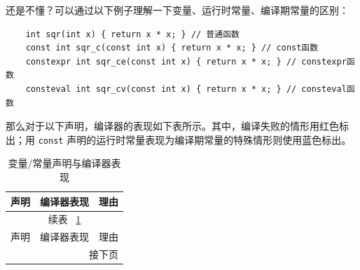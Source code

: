 \begin{tip}
  还是不懂？可以通过以下例子理解一下变量、运行时常量、编译期常量的区别：
\begin{verbatim}
    int sqr(int x) { return x * x; } // 普通函数
    const int sqr_c(const int x) { return x * x; } // const函数
    constexpr int sqr_ce(const int x) { return x * x; } // constexpr函数
    consteval int sqr_cv(const int x) { return x * x; } // consteval函数
\end{verbatim}

  那么对于以下声明，编译器的表现如下表所示。其中，编译失败的情形用红色标出；用 \texttt{const} 声明的运行时常量表现为编译期常量的特殊情形则使用蓝色标出。
  \begin{small}            %
    \begin{longtable}[c]{lll}
      \caption{变量/常量声明与编译器表现}
      \label{tab:long}\\
      \toprule
      声明 & 编译器表现 & 理由 \\
      \midrule
      \endfirsthead          %

      \multicolumn{3}{c}{\footnotesize 续表~ \ref{tab:long} }\\[.5ex]
      \toprule
      声明 & 编译器表现 & 理由 \\
      \midrule
      \endhead               %

      \midrule
      \multicolumn{3}{r}{\footnotesize 接下页}
      \endfoot               %

      \bottomrule
      \endlastfoot           %


\end{longtable}
\end{small}
\end{tip}

